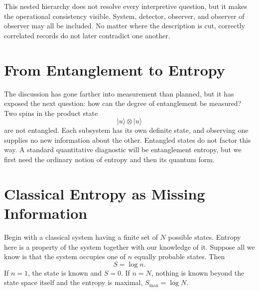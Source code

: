 \begin{classroomqa}
\end{classroomqa}

This nested hierarchy does not resolve every interpretive question, but it makes the operational consistency visible. System, detector, observer, and observer of observer may all be included. No matter where the description is cut, correctly correlated records do not later contradict one another.

\section{From Entanglement to Entropy}

The discussion has gone farther into measurement than planned, but it has exposed the next question: how can the degree of entanglement be measured? Two spins in the product state
\begin{equation}
|u\rangle\otimes|u\rangle
\end{equation}
are not entangled. Each subsystem has its own definite state, and observing one supplies no new information about the other. Entangled states do not factor this way. A standard quantitative diagnostic will be entanglement entropy, but we first need the ordinary notion of entropy and then its quantum form.

\section{Classical Entropy as Missing Information}

Begin with a classical system having a finite set of \(N\) possible states. Entropy here is a property of the system together with our knowledge of it. Suppose all we know is that the system occupies one of \(n\) equally probable states. Then
\begin{equation}
S=\log n.
\end{equation}
If \(n=1\), the state is known and \(S=0\). If \(n=N\), nothing is known beyond the state space itself and the entropy is maximal, \(S_{\max}=\log N\).

